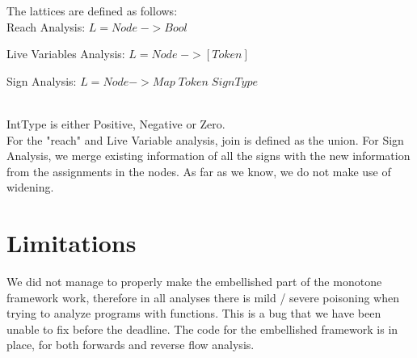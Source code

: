 \documentclass[10pt]{article}
\begin{document}
The lattices are defined as follows: \\ 
Reach Analysis: $L = Node \; -> Bool $ \\

Live Variables Analysis: $ L = Node \; -> [Token] $ \\


Sign Analysis: $ L = Node -> Map \; Token \; SignType $\\

\\
IntType is either Positive, Negative or Zero.\\

For the "reach" and Live Variable analysis, join is defined as the union. For Sign Analysis, we merge existing information of all the signs with the new information from the assignments in the nodes. As far as we know, we do not make use of widening.

\section{Limitations}
We did not manage to properly make the embellished part of the monotone framework work, therefore in all analyses there is mild / severe poisoning when trying to analyze programs with functions. This is a bug that we have been unable to fix before the deadline. The code for the embellished framework is in place, for both forwards and reverse flow analysis.
\end{document}
